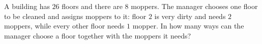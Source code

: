 A building has $26$ floors and there are $8$ moppers. The manager chooses one floor to be cleaned and assigns moppers to it: floor $2$ is very dirty and needs $2$ moppers, while every other floor needs $1$ mopper. In how many ways can the manager choose a floor together with the moppers it needs?

